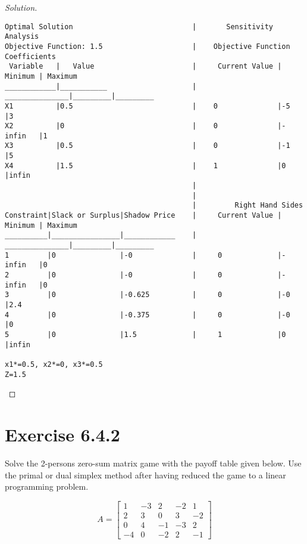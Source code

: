 \documentclass[titlepage, letterpaper, fleqn]{article}
\renewcommand\qedsymbol{\(\blacksquare\)}
\newenvironment{solution}
{\renewcommand\qedsymbol{$\square$}\begin{proof}[Solution]}
{\end{proof}}
\begin{document}
\begin{solution}
\begin{lstlisting}[basicstyle=\tiny]
Optimal Solution                            |       Sensitivity Analysis
Objective Function: 1.5                     |    Objective Function Coefficients
 Variable   |   Value                       |     Current Value | Minimum | Maximum 
____________|___________                    |    _______________|_________|_________
X1          |0.5                            |    0              |-5       |3
X2          |0                              |    0              |-infin   |1
X3          |0.5                            |    0              |-1       |5
X4          |1.5                            |    1              |0        |infin
                                            |
                                            |
                                            |         Right Hand Sides
Constraint|Slack or Surplus|Shadow Price    |     Current Value | Minimum | Maximum 
__________|________________|____________    |    _______________|_________|_________
1         |0               |-0              |     0             |-infin   |0
2         |0               |-0              |     0             |-infin   |0
3         |0               |-0.625          |     0             |-0       |2.4
4         |0               |-0.375          |     0             |-0       |0
5         |0               |1.5             |     1             |0        |infin

x1*=0.5, x2*=0, x3*=0.5
Z=1.5
\end{lstlisting}

\end{solution}

\section{Exercise 6.4.2}

{\large Solve the 2-persons zero-sum matrix game with the payoff table given below.
Use the primal or dual simplex method after having reduced the game to a linear programming problem.

$$A =
\begin{bmatrix}
1 & -3 & 2 & -2 & 1 \\
2 & 3 & 0 & 3 & -2 \\
0 & 4 & -1 & -3 & 2 \\
-4 & 0 & -2 & 2 & -1
\end{bmatrix}$$}
\end{document}
